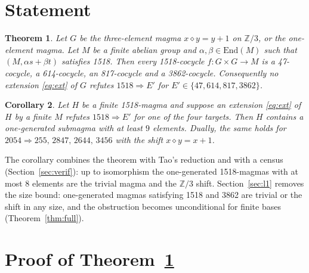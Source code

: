 \documentclass[11pt]{article}
\newtheorem{theorem}{Theorem}
\newtheorem{corollary}[theorem]{Corollary}
\theoremstyle{remark}\newtheorem*{remark}{Remark}
\newcommand{\op}{\diamond}
\newcommand{\Z}{\mathbb{Z}}
\newcommand{\End}{\mathrm{End}}
\begin{document}
\section{Statement}

\begin{theorem}\label{thm:main}
Let $G$ be the three-element magma $x\op y = y+1$ on $\Z/3$, or the one-element magma. Let $M$ be a \emph{finite} abelian group and $\alpha,\beta\in\End(M)$ such that $(M,\alpha s+\beta t)$ satisfies 1518. Then every 1518-cocycle $f\colon G\times G\to M$ is a 47-cocycle, a 614-cocycle, an 817-cocycle and a 3862-cocycle. Consequently no extension \eqref{eq:ext} of $G$ refutes $1518\Rightarrow E'$ for $E'\in\{47,614,817,3862\}$.
\end{theorem}

\begin{corollary}\label{cor:main}
Let $H$ be a finite 1518-magma and suppose an extension \eqref{eq:ext} of $H$ by a finite $M$ refutes $1518\Rightarrow E'$ for one of the four targets. Then $H$ contains a one-generated submagma with at least $9$ elements. Dually, the same holds for $2054 \Rightarrow 255,\,2847,\,2644,\,3456$ with the shift $x\op y=x+1$.
\end{corollary}

The corollary combines the theorem with Tao's reduction and with a census (Section~\ref{sec:verif}): up to isomorphism the one-generated 1518-magmas with at most 8 elements are the trivial magma and the $\Z/3$ shift. Section~\ref{sec:l1} removes the size bound: one-generated magmas satisfying 1518 and 3862 are trivial or the shift in any size, and the obstruction becomes unconditional for finite bases (Theorem~\ref{thm:full}).

\section{Proof of Theorem~\ref{thm:main}}
\end{document}
